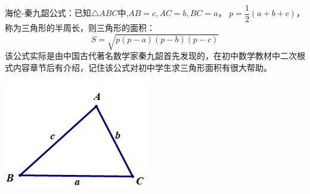 \documentclass[10pt]{ctexart}
\begin{document}
\begin{minipage}[t]{0.7\textwidth}
\begin{dkyi}{}{}
海伦-秦九韶公式：已知$\triangle ABC$中,$AB=c,AC=b,BC=a$，
$p=\dfrac{1}{2}(a+b+c)$，称为三角形的半周长，则三角形的面积：
\[S=\sqrt{p(p-a)(p-b)(p-c)}\]
该公式实际是由中国古代著名数学家秦九韶首先发现的，在初中数学教材中二次根式内容章节后有介绍，记住该公式对初中学生求三角形面积有很大帮助。
\end{dkyi}
\end{minipage}
\begin{minipage}[t]{0.3\textwidth}
\includegraphics[scale=0.6]{figure/mj-03.png}
\end{minipage}
\end{document}
